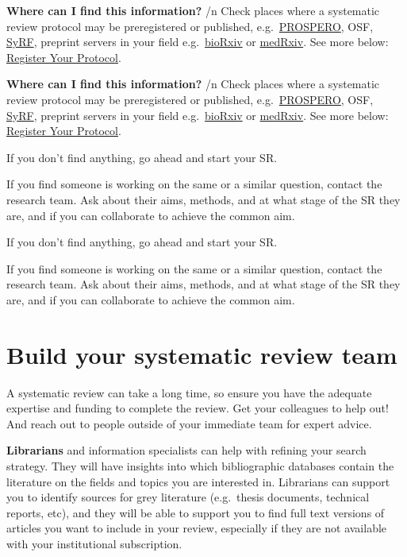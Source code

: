 \documentclass[
]{book}
\begin{document}
\textbf{Where can I find this information?}
/n
Check places where a systematic review protocol may be preregistered or published, e.g.~\href{https://www.crd.york.ac.uk/prospero/}{PROSPERO}, OSF, \href{http://syrf.org.uk/}{SyRF}, preprint servers in your field e.g.~\href{https://www.biorxiv.org/}{bioRxiv} or \href{https://www.medrxiv.org/}{medRxiv}. See more below: \protect\hyperlink{register-your-protocol}{Register Your Protocol}.

\textbf{Where can I find this information?}
/n
Check places where a systematic review protocol may be preregistered or published, e.g.~\href{https://www.crd.york.ac.uk/prospero/}{PROSPERO}, OSF, \href{http://syrf.org.uk/}{SyRF}, preprint servers in your field e.g.~\href{https://www.biorxiv.org/}{bioRxiv} or \href{https://www.medrxiv.org/}{medRxiv}. See more below: \protect\hyperlink{register-your-protocol}{Register Your Protocol}.

If you don't find anything, go ahead and start your SR.

If you find someone is working on the same or a similar question, contact the research team. Ask about their aims, methods, and at what stage of the SR they are, and if you can collaborate to achieve the common aim.

If you don't find anything, go ahead and start your SR.

If you find someone is working on the same or a similar question, contact the research team. Ask about their aims, methods, and at what stage of the SR they are, and if you can collaborate to achieve the common aim.

\hypertarget{build-your-systematic-review-team}{%
\section{Build your systematic review team}\label{build-your-systematic-review-team}}

A systematic review can take a long time, so ensure you have the adequate expertise and funding to complete the review. Get your colleagues to help out! And reach out to people outside of your immediate team for expert advice.

\textbf{Librarians} and information specialists can help with refining your search strategy. They will have insights into which bibliographic databases contain the literature on the fields and topics you are interested in. Librarians can support you to identify sources for grey literature (e.g.~thesis documents, technical reports, etc), and they will be able to support you to find full text versions of articles you want to include in your review, especially if they are not available with your institutional subscription.
\end{document}
